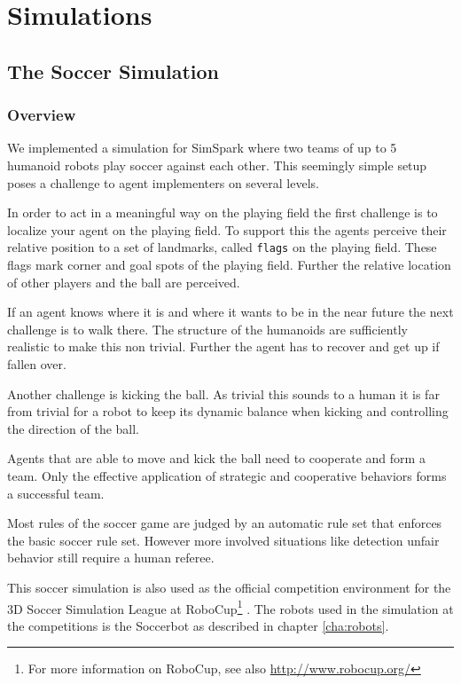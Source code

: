 \chapter{Simulations}
\label{cha:simulations}

\section{The Soccer Simulation}
\label{sec:soccersimulation}

\subsection{Overview}

We implemented a simulation for SimSpark where two teams of up to 5
humanoid robots play soccer against each other. This seemingly simple
setup poses a challenge to agent implementers on several levels.

In order to act in a meaningful way on the playing field the first
challenge is to localize your agent on the playing field. To support
this the agents perceive their relative position to a set of
landmarks, called \texttt{flags} on the playing field. These flags
mark corner and goal spots of the playing field. Further the relative
location of other players and the ball are perceived.

If an agent knows where it is and where it wants to be in the near
future the next challenge is to walk there. The structure of the
humanoids are sufficiently realistic to make this non trivial. Further
the agent has to recover and get up if fallen over.

Another challenge is kicking the ball. As trivial this sounds to a
human it is far from trivial for a robot to keep its dynamic balance
when kicking and controlling the direction of the ball.

Agents that are able to move and kick the ball need to cooperate and
form a team. Only the effective application of strategic and
cooperative behaviors forms a successful team.

Most rules of the soccer game are judged by an automatic rule set that
enforces the basic soccer rule set. However more involved situations
like detection unfair behavior still require a human referee.

This soccer simulation is also used as the official competition environment for the 3D Soccer Simulation League at RoboCup\footnote{For more information on RoboCup, see also \url{http://www.robocup.org/}} \cite{KAK+97}\cite{KA00}\cite{BMO+05}\cite{MBS+07}. The robots used in the simulation at the competitions is the Soccerbot as described in chapter \ref{cha:robots}.

